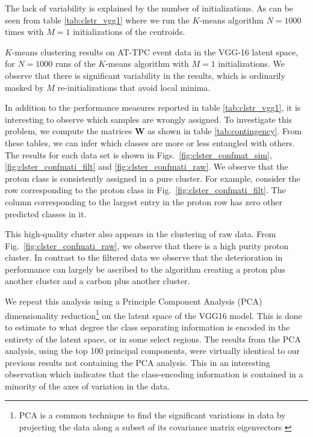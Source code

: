\documentclass[review,sort&compress]{elsarticle}
\begin{document}
\noindent The lack of variability is explained by the number of initializations. As can be seen from table \ref{tab:clstr_vgg1} where we run the $K$-means algorithm $N=1000$ times with $M=1$ initializations of the centroids. 

\begin{table}[H]
\centering 
\caption[$K$-means on pre-trained model]{$K$-means clustering results on AT-TPC event data in the VGG-16 latent space, for $N=1000$ runs of the $K$-means algorithm with $M=1$ initializations. We observe that there is significant variability in the results, which is ordinarily masked by $M$ re-initializations that avoid local minima. }\label{tab:clstr_vgg1}

\end{table}


In addition to the performance measures reported in table \ref{tab:clstr_vgg1}, it is interesting to observe which samples are wrongly assigned. To investigate this problem, we compute the matrices $\mathbf{W}$ as shown in table \ref{tab:contingency}. From these tables, we can infer which classes are more or less entangled with others. The results for each data set is shown in  Figs.~\ref{fig:clster_confmat_sim}, \ref{fig:clster_confmati_filt} and \ref{fig:clster_confmati_raw}. We observe that the proton class is consistently assigned in a pure cluster. For example, consider the row corresponding to the proton class in Fig.~\ref{fig:clster_confmati_filt}. The column corresponding to the largest entry in the proton row has zero other predicted classes in it.

This high-quality cluster also appears in the clustering of raw data. From Fig.~\ref{fig:clster_confmati_raw}, we observe that there is a high purity proton cluster. In contrast to the filtered data we observe that the deterioration in performance can largely be ascribed to the algorithm creating a proton plus another cluster and a carbon plus another cluster.



We repeat this analysis using a Principle Component Analysis (PCA) dimensionality reduction\footnote{
PCA is a common technique to find the significant variations in data by projecting the data along a subset of its covariance matrix eigenvectors \cite{vidal2016,Marsland2009}
} on the latent space of the VGG16 model. This is done to estimate to what degree the class separating information is encoded in the entirety of the latent space, or in some select regions. The results from the PCA analysis, using the top 100 principal components, were virtually identical to our previous results not containing  the PCA analysis. This in an interesting observation which indicates that the class-encoding information is contained in a minority of the axes of variation in the data.
\end{document}

